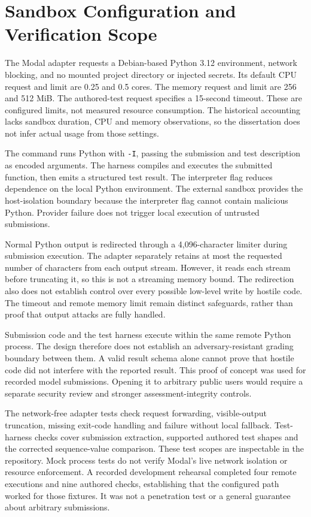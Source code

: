 \section{Sandbox Configuration and Verification Scope}

The Modal adapter requests a Debian-based Python 3.12 environment, network blocking, and no mounted project directory or
injected secrets. Its default CPU request and limit are 0.25 and 0.5 cores. The memory request and limit are 256 and 512 MiB.
The authored-test request specifies a 15-second timeout. These are configured limits, not measured resource consumption.
The historical accounting lacks sandbox duration, CPU and memory observations, so the dissertation does not infer actual
usage from those settings.

The command runs Python with \texttt{-I}, passing the submission and test description as encoded arguments. The harness
compiles and executes the submitted function, then emits a structured test result. The interpreter flag reduces dependence
on the local Python environment. The external sandbox provides the
host-isolation boundary because the interpreter flag cannot contain malicious Python. Provider failure does not trigger
local execution of untrusted submissions.

Normal Python output is redirected through a 4,096-character limiter during submission execution. The adapter separately
retains at most the requested number of characters from each output stream. However, it reads each stream before truncating
it, so this is not a streaming memory bound. The redirection also does not establish control over every possible low-level
write by hostile code. The timeout and remote memory limit remain distinct safeguards, rather than proof that output attacks
are fully handled.

Submission code and the test harness execute within the same remote Python process. The design therefore does not establish
an adversary-resistant grading boundary between them. A valid result schema alone cannot prove that hostile code did not
interfere with the reported result. This proof of concept was used for recorded model submissions. Opening it to arbitrary
public users would require a separate security review and stronger assessment-integrity controls.

The network-free adapter tests check request forwarding, visible-output truncation, missing exit-code handling and failure
without local fallback. Test-harness checks cover submission extraction, supported authored test shapes and the corrected
sequence-value comparison. These test scopes are inspectable in the repository. Mock process tests do not verify Modal's
live network isolation or resource enforcement. A recorded development rehearsal completed four remote executions and nine
authored checks, establishing that the configured path worked for those fixtures. It was not a penetration test or a
general guarantee about arbitrary submissions.

